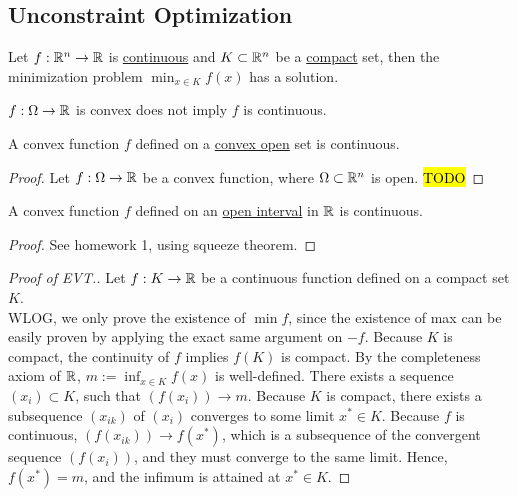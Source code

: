 \documentclass{article}
\begin{document}
	\subsection{Unconstraint Optimization}
    \begin{theorem}
        Let $f: \mathbb{R}^n \to \mathbb{R}$ is \ul{continuous} and $K \subset \mathbb{R}^n$ be a \ul{compact} set, then the minimization problem $\min_{x \in K} f(x)$ has a solution.
    \end{theorem}
    
    \begin{remark}
    	$f: \Omega \to \mathbb{R}$ is convex does not imply $f$ is continuous.
    \end{remark}
    
    \begin{proposition}
    	A convex function $f$ defined on a \ul{convex open} set is continuous.
    \end{proposition}
    
    \begin{proof}
    	Let $f: \Omega \to \mathbb{R}$ be a convex function, where $\Omega \subset \mathbb{R}^n$ is open.
    	\hl{TODO}
    \end{proof}
    
    \begin{corollary}
    	A convex function $f$ defined on an \ul{open interval} in $\mathbb{R}$ is continuous.
    \end{corollary}
    
    \begin{proof}
    	See homework 1, using squeeze theorem.
    \end{proof}
    
    \begin{proof}[Proof of EVT.]
    	Let $f: K \to \mathbb{R}$ be a continuous function defined on a compact set $K$.\\
    	WLOG, we only prove the existence of $\min f$, since the existence of max can be easily proven by applying the exact same argument on $-f$. Because $K$ is compact, the continuity of $f$ implies $f(K)$ is compact. By the completeness axiom of $\mathbb{R}$, $m := \inf_{x \in K} f(x)$ is well-defined. There exists a sequence $(x_i) \subset K$, such that $(f(x_i)) \to m$. Because $K$ is compact, there exists a subsequence $(x_{ik})$ of $(x_i)$ converges to some limit $x^* \in K$. Because $f$ is continuous, $(f(x_{ik})) \to f(x^*)$, which is a subsequence of the convergent sequence $(f(x_i))$, and they must converge to the same limit. Hence, $f(x^*) = m$, and the infimum is attained at $x^* \in K$.
    \end{proof}
    
\end{document}
